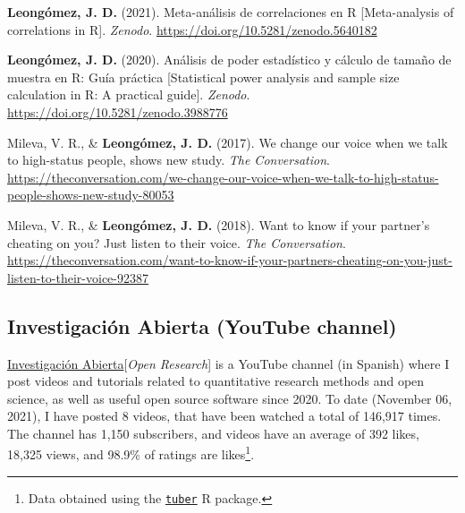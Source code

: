 \documentclass[11pt, a4paper]{awesome-cv}
\begin{document}
\begingroup
\setlength{\parindent}{-0.5in}
\setlength{\leftskip}{0.5in}

\hypertarget{refs_divulgation}{}
\leavevmode{}%
\textbf{Leongómez, J. D.} (2021). {Meta-análisis de correlaciones en R
{[}Meta-analysis of correlations in R{]}}. \emph{Zenodo}.
\url{https://doi.org/10.5281/zenodo.5640182}

\leavevmode{}%
\textbf{Leongómez, J. D.} (2020). {Análisis de poder estadístico y
cálculo de tamaño de muestra en R: Guía práctica {[}Statistical power
analysis and sample size calculation in R: A practical guide{]}}.
\emph{Zenodo}. \url{https://doi.org/10.5281/zenodo.3988776}

\leavevmode{}%
Mileva, V. R., \& \textbf{Leongómez, J. D.} (2017). {We change our voice
when we talk to high-status people, shows new study}. \emph{The
Conversation}.
\url{https://theconversation.com/we-change-our-voice-when-we-talk-to-high-status-people-shows-new-study-80053}

\leavevmode{}%
Mileva, V. R., \& \textbf{Leongómez, J. D.} (2018). {Want to know if
your partner's cheating on you? Just listen to their voice}. \emph{The
Conversation}.
\url{https://theconversation.com/want-to-know-if-your-partners-cheating-on-you-just-listen-to-their-voice-92387}

\endgroup

\hypertarget{section-4}{%
\subsection{\texorpdfstring{\textbf{Investigación Abierta (YouTube channel)}}{}}\label{section-4}}

\href{https://www.youtube.com/c/InvestigaciónAbierta}{\textcolor{red}{\faYoutubePlay}
Investigación Abierta}{[}\textit{Open Research}{]} is a YouTube channel
(in Spanish) where I post videos and tutorials related to quantitative
research methods and open science, as well as useful open source
software since 2020. To date (November 06, 2021), I have posted 8
videos, that have been watched a total of 146,917 times. The channel has
1,150 subscribers, and videos have an average of 392 likes, 18,325
views, and 98.9\% of ratings are likes\footnote{Data obtained using the
  \href{https://cran.r-project.org/web/packages/tuber/index.html}{\texttt{tuber}}
  R package.}.

\begingroup
\setlength{\parindent}{-0.5in}
\setlength{\leftskip}{0.5in}
\end{document}
